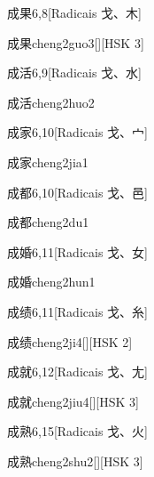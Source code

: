 \begin{entry}{成果}{6,8}[Radicais ⼽、⽊]
  \begin{phonetics}{成果}{cheng2guo3}[][HSK 3]
  \end{phonetics}
\end{entry}

\begin{entry}{成活}{6,9}[Radicais ⼽、⽔]
  \begin{phonetics}{成活}{cheng2huo2}
  \end{phonetics}
\end{entry}

\begin{entry}{成家}{6,10}[Radicais ⼽、⼧]
  \begin{phonetics}{成家}{cheng2jia1}
  \end{phonetics}
\end{entry}

\begin{entry}{成都}{6,10}[Radicais ⼽、⾢]
  \begin{phonetics}{成都}{cheng2du1}
  \end{phonetics}
\end{entry}

\begin{entry}{成婚}{6,11}[Radicais ⼽、⼥]
  \begin{phonetics}{成婚}{cheng2hun1}
  \end{phonetics}
\end{entry}

\begin{entry}{成绩}{6,11}[Radicais ⼽、⽷]
  \begin{phonetics}{成绩}{cheng2ji4}[][HSK 2]
  \end{phonetics}
\end{entry}

\begin{entry}{成就}{6,12}[Radicais ⼽、⼪]
  \begin{phonetics}{成就}{cheng2jiu4}[][HSK 3]
  \end{phonetics}
\end{entry}

\begin{entry}{成熟}{6,15}[Radicais ⼽、⽕]
  \begin{phonetics}{成熟}{cheng2shu2}[][HSK 3]
  \end{phonetics}
\end{entry}

